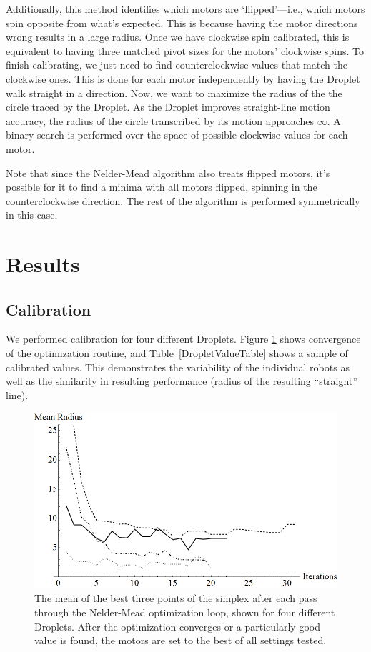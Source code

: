 \documentclass[letterpaper, 10pt, conference]{ieeeconf}
\begin{document}
Additionally, this method identifies which motors are `flipped'---i.e., which motors spin opposite from what's expected. This is because having the motor directions wrong results in a large radius. Once we have clockwise spin calibrated, this is equivalent to having three matched pivot sizes for the motors' clockwise spins. To finish calibrating, we just need to find counterclockwise values that match the clockwise ones. This is done for each motor independently by having the Droplet walk straight in a direction. Now, we want to maximize the radius of the the circle traced by the Droplet. As the Droplet improves straight-line motion accuracy, the radius of the circle transcribed by its motion approaches $\infty$. A binary search is performed over the space of possible clockwise values for each motor.

Note that since the Nelder-Mead algorithm also treats flipped motors, it's possible for it to find a minima with all motors flipped, spinning in the counterclockwise direction. The rest of the algorithm is performed symmetrically in this case.

\section{Results}

\subsection{Calibration}
We performed calibration for four different Droplets. Figure \ref{fig:radiiConverging} shows convergence of the optimization routine, and Table~\ref{DropletValueTable} shows a sample of calibrated values. This demonstrates the variability of the individual robots as well as the similarity in resulting performance (radius of the resulting ``straight'' line).

\begin{figure}[!htb]
\centering
\includegraphics[width=\linewidth]{Images/radiiConverging.png}
\caption{The mean of the best three points of the simplex after each pass through the Nelder-Mead optimization loop, shown for four different Droplets. After the optimization converges or a particularly good value is found, the motors are set to the best of all settings tested.}
\label{fig:radiiConverging}
\end{figure}
\end{document}
